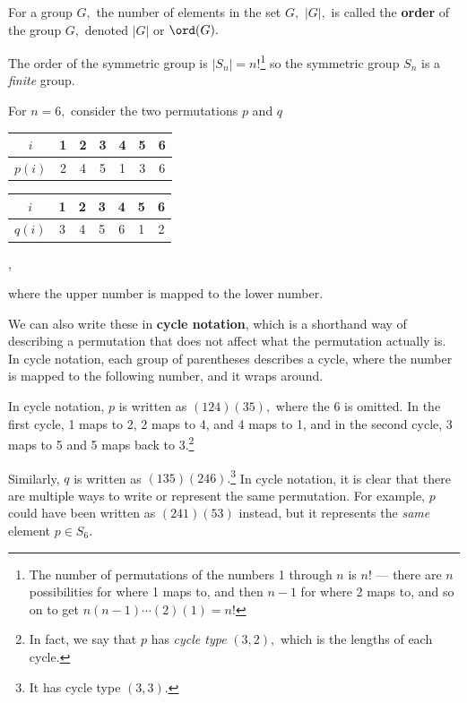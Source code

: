 \begin{definition}
For a group $G,$ the number of elements in the set $G,$ $|G|,$ is called the \textbf{order} of the group $G,$ denoted $|G|$ or $\ord(G).$
\end{definition}

The order of the symmetric group is $|S_n| = n!$\footnote{The number of permutations of the numbers 1 through $n$ is $n!$ --- there are $n$ possibilities for where 1 maps to, and then $n-1$ for where 2 maps to, and so on to get $n(n-1)\cdots (2)(1) = n!$} so the symmetric group $S_n$ is a \emph{finite} group. 

For $n=6,$ consider the two permutations $p$ and $q$
\begin{center}
    \begin{tabular}{c|c c c c c c}
     $i$ & 1 & 2 & 3 & 4 & 5 & 6 \\
     \hline 
     $p(i)$ & 2 & 4 & 5 & 1 & 3 & 6
\end{tabular}
\end{center}
\begin{center}
    \begin{tabular}{c|c c c c c c}
     $i$ & 1 & 2 & 3 & 4 & 5 & 6 \\
     \hline 
     $q(i)$ & 3 & 4 & 5 & 6 & 1 & 2
\end{tabular},
\end{center}
where the upper number is mapped to the lower number. 

We can also write these in \textbf{cycle notation}, which is a shorthand way of describing a permutation that does not affect what the permutation actually is. In cycle notation, each group of parentheses describes a cycle, where the number is mapped to the following number, and it wraps around. 
\begin{example}
In cycle notation, $p$ is written as $(124)(35),$ where the 6 is omitted. In the first cycle, 1 maps to 2, 2 maps to 4, and 4 maps to 1, and in the second cycle, 3 maps to 5 and 5 maps back to 3.\footnote{In fact, we say that $p$ has \emph{cycle type} $(3, 2),$ which is the lengths of each cycle.} 
\end{example}

Similarly, $q$ is written as $(135)(246).$\footnote{It has cycle type $(3, 3).$} In cycle notation, it is clear that there are multiple ways to write or represent the same permutation. For example, $p$ could have been written as $(241)(53)$ instead, but it represents the \emph{same} element $p \in S_6.$

